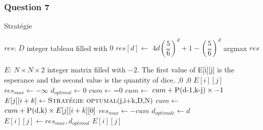 \documentclass[12pt,a4paper]{article}
\begin{document}
\subsubsection{Question 7}
\begin{algorithm}
\caption{Stratégie}
\begin{algorithmic}[1]
	\State $res$: $D$ integer tableau filled with $0$   	
            \State $res[d] \gets $ $4d(\dfrac{5}{6})^d+1-(\dfrac{5}{6})^d$
    \EndFor
    \State \Return argmax $res$
\EndFunction

    \State $E$: $N \times N \times 2$ integer matrix filled with $-2$. The first value of E[i][j] is the esperance and the second value is the quantity of dice. 
    	\State {},0
    \EndIf
    	\State {},0
   	\EndIf
    	\State \Return $E[i][j]$    
    \Else
    \State $res_{max} \gets -\infty$
    \State $d_{optimal} \gets 0$
    			\State $cum \gets $=0
            			\State $cum \gets $ $cum +\Call{P}{$d-1$, $k-j$} \times -1$
            		\Else 
            				\State $E[j][i+k] \gets \Call{Stratégie optumal}{$j$,$i+k$,$D$,$N$}$
            			\EndIf
            			\State $cum \gets $ $cum +\Call{P}{$d$, $k$} \times E[j][i+k][0]$	
					\EndIf
				\EndFor
					\State $res_{max} \gets -cum$
					\State $d_{optimale} \gets d$
				\EndIf	    	
    	\EndFor
    \EndIf
    $E[i][j] \gets res_{max},d_{optimal}$
    \State \Return $E[i][j]$
\EndFunction
\end{algorithmic}
\end{algorithm}
\end{document}
